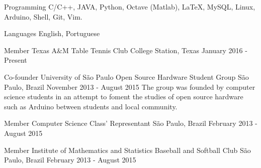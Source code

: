 \documentclass[11pt, a4paper]{awesome-cv-res}
\begin{document}
\begin{cvskills}
\cvskill
{Programming} %
{C/C++, JAVA, Python, Octave (Matlab), LaTeX, MySQL, Linux, Arduino, Shell, Git, Vim.} %

\cvskill
{Languages} %
{English, Portuguese} %

\end{cvskills}

\begin{cventries}

\cventry
{Member}
{Texas A\&M Table Tennis Club}
{College Station, Texas}
{January 2016 - Present}
{}

\cventry
{Co-founder}
{University of São Paulo Open Source Hardware Student Group}
{São Paulo, Brazil}
{November 2013 - August 2015}
{The group was founded by computer science students in an attempt to foment the studies of open source hardware such as Arduino between students and local community.}
\newline
\newline

\cventry
{Member}
{Computer Science Class' Representant}
{São Paulo, Brazil}
{February 2013 - August 2015}
{}

\cventry
{Member}
{Institute of Mathematics and Statistics Baseball and Softball Club}
{São Paulo, Brazil}
{February 2013 - August 2015}
{}

\end{cventries}
\end{document}
